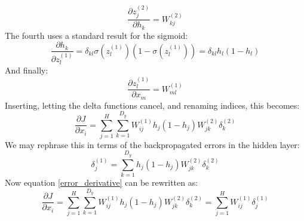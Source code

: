 \documentclass[12pt, a4paper]{article}
\numberwithin{equation}{section}
\begin{document}
\begin{equation}
\frac{\partial z^{(2)}_j}{\partial h_k}=W^{(2)}_{kj}
\end{equation}
The fourth uses a standard result for the sigmoid:
\begin{equation}
\frac{\partial h_k}{\partial z^{(1)}_l}=\delta_{kl}\sigma(z^{(1)}_l)(1-\sigma(z^{(1)}_l))=\delta_{kl}h_l(1-h_l)
\end{equation}
And finally:
\begin{equation}
\frac{\partial z^{(1)}_l}{\partial x_m}=W^{(1)}_{ml}
\end{equation}
Inserting, letting the delta functions cancel, and renaming indices, this becomes:
\begin{equation}
\label{error_derivative}
\frac{\partial J}{\partial x_i}=\sum_{j=1}^H\sum_{k=1}^{D_y}W^{(1)}_{ij}h_j(1-h_j)W^{(2)}_{jk}\delta^{(2)}_k
\end{equation}
We may rephrase this in terms of the backpropagated errors in the hidden layer:
\begin{equation}
\delta^{(1)}_j=\sum_{k=1}^{D_y}h_j(1-h_j)W^{(2)}_{jk}\delta^{(2)}_k
\end{equation}
Now equation \ref{error_derivative} can be rewritten as:
\begin{equation}
\frac{\partial J}{\partial x_i}=\sum_{j=1}^H\sum_{k=1}^{D_y}W^{(1)}_{ij}h_j(1-h_j)W^{(2)}_{jk}\delta^{(2)}_k=\sum_{j=1}^H W^{(1)}_{ij}\delta^{(1)}_j
\end{equation}
\end{document}
